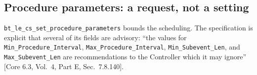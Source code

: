 \documentclass[11pt,a4paper]{article}
\newcommand{\code}[1]{\texttt{\small #1}}
\newcommand{\core}[1]{\textcolor{rulegrey}{\small[Core 6.3, #1]}}
\begin{document}
\subsection{Procedure parameters: a request, not a setting}
\label{sec:procparams}

\code{bt\_\allowbreak{}le\_\allowbreak{}cs\_\allowbreak{}set\_\allowbreak{}procedure\_\allowbreak{}parameters} bounds the scheduling. The specification is
explicit that several of its fields are advisory: ``the values for
\code{Min\_\allowbreak{}Procedure\_\allowbreak{}Interval}, \code{Max\_\allowbreak{}Procedure\_\allowbreak{}Interval},
\code{Min\_\allowbreak{}Subevent\_\allowbreak{}Len}, and \code{Max\_\allowbreak{}Subevent\_\allowbreak{}Len} are recommendations to the
Controller which it may ignore'' \core{Vol.\ 4, Part E, Sec.\ 7.8.140}.
\end{document}
